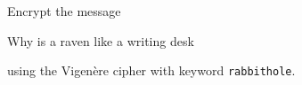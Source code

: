 \begin{problem}

Encrypt the message 
\begin{center}
\textsf{Why is a raven like a writing desk} 
\end{center}
using the Vigen\`ere cipher with keyword \texttt{rabbithole}.
\end{problem}

\begin{Answer}

\end{Answer}
